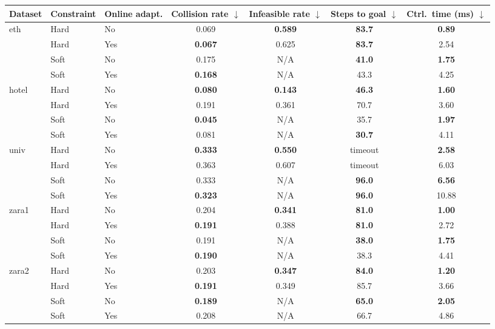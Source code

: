 \begin{tabular}{lllcccc}
\hline
Dataset & Constraint & Online adapt. & Collision rate $\downarrow$ & Infeasible rate $\downarrow$ & Steps to goal $\downarrow$ & Ctrl.\ time (ms) $\downarrow$ \\
\hline
eth & Hard & No & 0.069 & \textbf{0.589} & \textbf{83.7} & \textbf{0.89} \\
 & Hard & Yes & \textbf{0.067} & 0.625 & \textbf{83.7} & 2.54 \\
 & Soft & No & 0.175 & N/A & \textbf{41.0} & \textbf{1.75} \\
 & Soft & Yes & \textbf{0.168} & N/A & 43.3 & 4.25 \\
\hline
hotel & Hard & No & \textbf{0.080} & \textbf{0.143} & \textbf{46.3} & \textbf{1.60} \\
 & Hard & Yes & 0.191 & 0.361 & 70.7 & 3.60 \\
 & Soft & No & \textbf{0.045} & N/A & 35.7 & \textbf{1.97} \\
 & Soft & Yes & 0.081 & N/A & \textbf{30.7} & 4.11 \\
\hline
univ & Hard & No & \textbf{0.333} & \textbf{0.550} & timeout & \textbf{2.58} \\
 & Hard & Yes & 0.363 & 0.607 & timeout & 6.03 \\
 & Soft & No & 0.333 & N/A & \textbf{96.0} & \textbf{6.56} \\
 & Soft & Yes & \textbf{0.323} & N/A & \textbf{96.0} & 10.88 \\
\hline
zara1 & Hard & No & 0.204 & \textbf{0.341} & \textbf{81.0} & \textbf{1.00} \\
 & Hard & Yes & \textbf{0.191} & 0.388 & \textbf{81.0} & 2.72 \\
 & Soft & No & 0.191 & N/A & \textbf{38.0} & \textbf{1.75} \\
 & Soft & Yes & \textbf{0.190} & N/A & 38.3 & 4.41 \\
\hline
zara2 & Hard & No & 0.203 & \textbf{0.347} & \textbf{84.0} & \textbf{1.20} \\
 & Hard & Yes & \textbf{0.191} & 0.349 & 85.7 & 3.66 \\
 & Soft & No & \textbf{0.189} & N/A & \textbf{65.0} & \textbf{2.05} \\
 & Soft & Yes & 0.208 & N/A & 66.7 & 4.86 \\
\hline
\end{tabular}